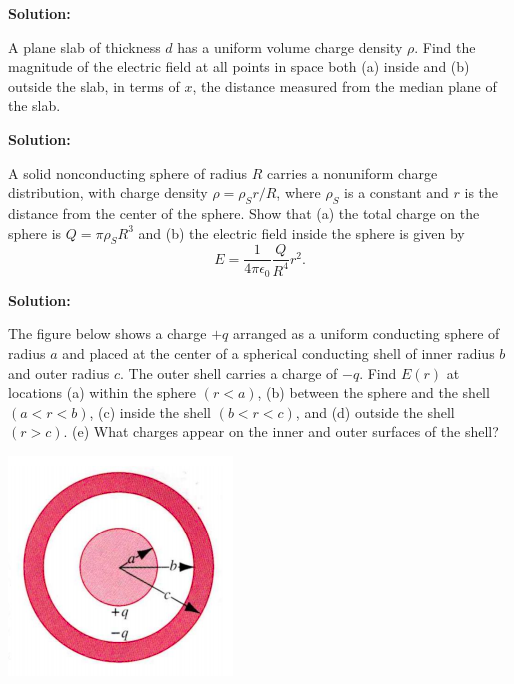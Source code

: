 \documentclass[11pt]{article}
\begin{document}
\textbf{Solution:}


\clearpage

\begin{problem}[(P27.16)]
A plane slab of thickness $d$ has a uniform volume charge density $\rho$. Find the magnitude of the electric field at all points in space both (a) inside and (b) outside
the slab, in terms of $x$, the distance measured from the median plane of the slab.
\end{problem}


\textbf{Solution:}


\clearpage

\begin{problem}[(P27.17)]
A solid nonconducting sphere of radius $R$ carries a nonuniform charge distribution, with charge density $\rho = \rho_S r/R$, where $\rho_S$ is a constant
and $r$ is the distance from the center of the sphere. Show that (a) the total charge on the sphere is $Q = \pi\rho_S R^3$ and (b) the electric field inside the
sphere is given by
$$
	E = \frac{1}{4\pi\epsilon_0} \frac{Q}{R^4} r^2.
$$
\end{problem}


\textbf{Solution:}


\clearpage

\begin{problem}[(P27.4)]
The figure below shows a charge $+q$ arranged as a uniform conducting sphere of radius $a$ and placed at the center of a spherical conducting shell of inner radius $b$ and outer
radius $c$. The outer shell carries a charge of $-q$. Find $E(r)$ at locations (a) within the sphere $(r<a)$, (b) between the sphere and the shell $(a<r<b)$, (c) inside the shell $(b<r<c)$, and (d) outside the shell $(r>c)$. (e) What charges appear on the inner and outer surfaces of the shell?
\begin{center}
\includegraphics[scale=0.6]{prob5.png}
\end{center}
\end{problem}
\end{document}
